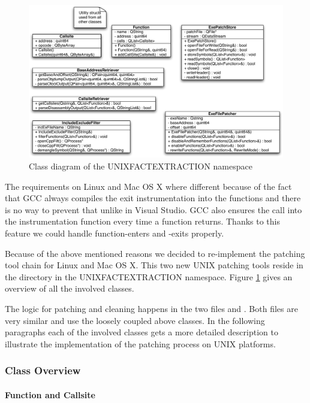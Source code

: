 \begin{figure}[ht]
\centering
\includegraphics[width=16cm]{images/unixpatchtools}
\caption{Class diagram of the UNIXFACTEXTRACTION namespace} \label{fig:unixfe_unixfe}
\end{figure}

The requirements on Linux and Mac OS X where different because of the fact that GCC always compiles the exit instrumentation into the functions and there is no way to prevent that unlike in Visual Studio.  GCC also ensures the call into the instrumentation function every time a function returns.  Thanks to this feature we could handle function-enters and -exits properly.

Because of the above mentioned reasons we decided to re-implement the patching tool chain for Linux and Mac OS X.  This two new UNIX patching tools reside in the  directory in the UNIXFACTEXTRACTION namespace.  Figure \ref{fig:unixfe_unixfe} gives an overview of all the involved classes.

The logic for patching and cleaning happens in the two files  and .  Both files are very similar and use the loosely coupled above classes.  In the following paragraphs each of the involved classes gets a more detailed description to illustrate the implementation of the patching process on UNIX platforms.

\subsubsection{Class Overview}

\paragraph{Function and Callsite}

